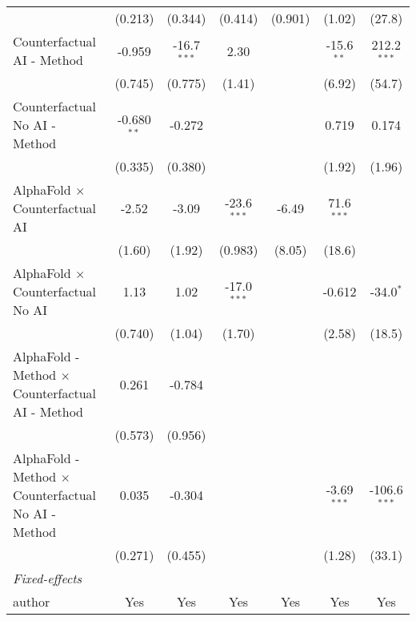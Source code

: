 \begin{tabular}{lcccccc}
                                                              & (0.213)       & (0.344)       & (0.414)       & (0.901) & (1.02)        & (27.8)\\   
   Counterfactual AI - Method                                 & -0.959        & -16.7$^{***}$ & 2.30          &         & -15.6$^{**}$  & 212.2$^{***}$\\   
                                                              & (0.745)       & (0.775)       & (1.41)        &         & (6.92)        & (54.7)\\   
   Counterfactual No AI - Method                              & -0.680$^{**}$ & -0.272        &               &         & 0.719         & 0.174\\   
                                                              & (0.335)       & (0.380)       &               &         & (1.92)        & (1.96)\\   
   AlphaFold $\times$ Counterfactual AI                       & -2.52         & -3.09         & -23.6$^{***}$ & -6.49   & 71.6$^{***}$  &   \\   
                                                              & (1.60)        & (1.92)        & (0.983)       & (8.05)  & (18.6)        &   \\   
   AlphaFold $\times$ Counterfactual No AI                    & 1.13          & 1.02          & -17.0$^{***}$ &         & -0.612        & -34.0$^{*}$\\   
                                                              & (0.740)       & (1.04)        & (1.70)        &         & (2.58)        & (18.5)\\   
   AlphaFold - Method $\times$ Counterfactual AI - Method     & 0.261         & -0.784        &               &         &               &   \\   
                                                              & (0.573)       & (0.956)       &               &         &               &   \\   
   AlphaFold - Method $\times$ Counterfactual No AI - Method  & 0.035         & -0.304        &               &         & -3.69$^{***}$ & -106.6$^{***}$\\   
                                                              & (0.271)       & (0.455)       &               &         & (1.28)        & (33.1)\\   
   \midrule
   \emph{Fixed-effects}\\
   author                                                     & Yes           & Yes           & Yes           & Yes     & Yes           & Yes\\  

\end{tabular}
